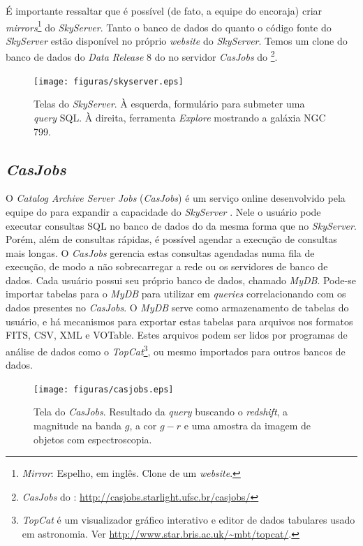 É importante ressaltar que é possível (de fato, a equipe do \SDSS encoraja)
criar {\em mirrors}\footnote{{\em Mirror}: Espelho, em inglês. Clone de um {\em
website}.} do {\em SkyServer}. Tanto o banco de dados do \SDSS quanto o código
fonte do {\em SkyServer} estão disponível no próprio {\em website} do {\em
SkyServer}. Temos um clone do banco de dados do {\em Data Release} 8 do \SDSS no
servidor {\em CasJobs} do \starlight \footnote{{\em CasJobs} do \starlight:
\url{http://casjobs.starlight.ufsc.br/casjobs/}}.

\begin{figure}
	\texttt{[image: figuras/skyserver.eps]}
	\caption[Telas do {\em SkyServer}.]
	{Telas do {\em SkyServer}. À esquerda, formulário para submeter uma {\em
	query} SQL. À direita, ferramenta {\em Explore} mostrando a galáxia NGC 799.}
	\label{fig:TelaDoSkyServer}
\end{figure}

\subsection{{\em CasJobs}}
\label{sec:CrossMatch:SDSS:CasJobs}

O {\em Catalog Archive Server Jobs} ({\em CasJobs}) é um serviço online
desenvolvido pela equipe do \SDSS para expandir a capacidade do {\em SkyServer}
\citep{Li2008}. Nele o usuário pode executar consultas SQL no banco de dados do
\SDSS da mesma forma que no {\em SkyServer}. Porém, além de consultas rápidas, é
possível agendar a execução de consultas mais longas. O {\em CasJobs} gerencia
estas consultas agendadas numa fila de execução, de modo a não sobrecarregar a
rede ou os servidores de banco de dados. Cada usuário possui seu próprio banco
de dados, chamado {\em MyDB}. Pode-se importar tabelas para o {\em MyDB} para
utilizar em {\em queries} correlacionando com os dados presentes no {\em
CasJobs}. O {\em MyDB} serve como armazenamento de tabelas do usuário, e há
mecanismos para exportar estas tabelas para arquivos nos formatos FITS, CSV, XML
e VOTable. Estes arquivos podem ser lidos por programas de análise de dados como
o {\em TopCat}\footnote{{\em TopCat} é um visualizador gráfico interativo e
editor de dados tabulares usado em astronomia. Ver
\url{http://www.star.bris.ac.uk/~mbt/topcat/}.}, ou mesmo importados para outros
bancos de dados.

\begin{figure}
	\texttt{[image: figuras/casjobs.eps]}
	\caption[Tela do {\em CasJobs}.]
	{Tela do {\em CasJobs}. Resultado da {\em query} buscando o {\em redshift}, a
	magnitude na banda $g$, a cor $g-r$ e uma amostra da imagem de objetos com
	espectroscopia.}
	\label{fig:CasJobs}
\end{figure}


